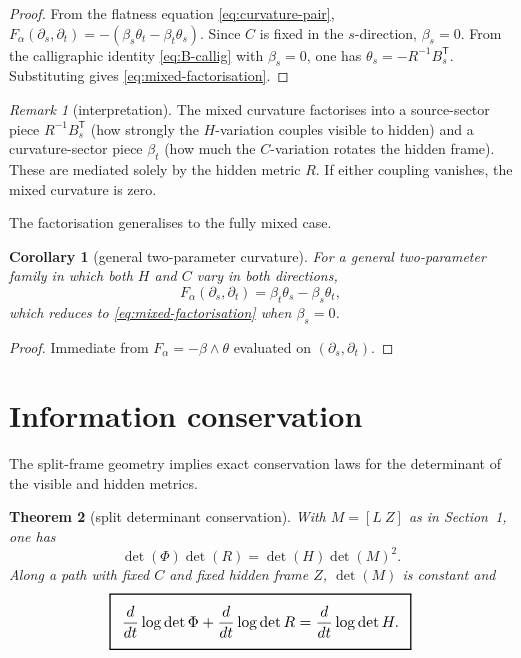 \documentclass[11pt,a4paper]{article}
\numberwithin{equation}{section}
\newcommand{\geomboxed}[1]{%
  \setlength{\fboxsep}{8pt}%
  \setlength{\fboxrule}{0.9pt}%
  \fbox{\scalebox{1.10}{$\displaystyle #1$}}%
}
\theoremstyle{thmcompact}
\newtheorem{theorem}{Theorem}[section]
\newtheorem{corollary}[theorem]{Corollary}
\theoremstyle{remark}
\newtheorem*{remarkplain}{Remark}
\newenvironment{remark}[1][]%
{\begin{remarkbox}\begin{remarkplain}[#1]\normalfont}
{\end{remarkplain}\end{remarkbox}}
\begin{document}
\begin{proof}
From the flatness equation \eqref{eq:curvature-pair}, $F_\alpha(\partial_s,\partial_t)=-(\beta_s\theta_t-\beta_t\theta_s)$. Since $C$ is fixed in the $s$-direction, $\beta_s=0$. From the calligraphic identity \eqref{eq:B-callig} with $\beta_s=0$, one has $\theta_s=-R^{-1}B_s^{\mathsf T}$. Substituting gives \eqref{eq:mixed-factorisation}.
\end{proof}

\begin{remark}[interpretation]
The mixed curvature factorises into a source-sector piece $R^{-1}B_s^{\mathsf T}$ (how strongly the $H$-variation couples visible to hidden) and a curvature-sector piece $\beta_t$ (how much the $C$-variation rotates the hidden frame). These are mediated solely by the hidden metric $R$. If either coupling vanishes, the mixed curvature is zero.
\end{remark}

The factorisation generalises to the fully mixed case.

\begin{corollary}[general two-parameter curvature]\label{cor:general-2param}
For a general two-parameter family in which both $H$ and $C$ vary in both directions,
\begin{equation}
F_\alpha(\partial_s,\partial_t)=\beta_t\theta_s-\beta_s\theta_t,
\label{eq:general-2param}
\end{equation}
which reduces to \eqref{eq:mixed-factorisation} when $\beta_s=0$.
\end{corollary}

\begin{proof}
Immediate from $F_\alpha=-\beta\wedge\theta$ evaluated on $(\partial_s,\partial_t)$.
\end{proof}

\section{Information conservation}

The split-frame geometry implies exact conservation laws for the determinant of the visible and hidden metrics.

\begin{theorem}[split determinant conservation]\label{thm:det-conservation}
With $M=[L\ Z]$ as in Section~1, one has
\begin{equation}
\det(\Phi)\det(R)=\det(H)\det(M)^2.
\label{eq:det-identity}
\end{equation}
Along a path with fixed $C$ and fixed hidden frame $Z$, $\det(M)$ is constant and
\begin{equation}
\geomboxed{\frac{d}{dt}\log\det\Phi+\frac{d}{dt}\log\det R=\frac{d}{dt}\log\det H.}
\label{eq:first-order-conservation}
\end{equation}
\end{theorem}
\end{document}
